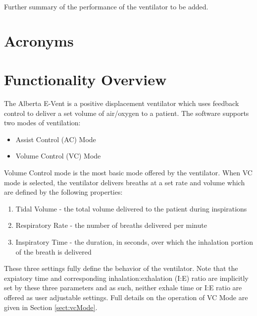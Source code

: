 \documentclass[]{article}
\begin{document}
Further summary of the performance of the ventilator to be added.

\clearpage

\section{Acronyms}

\begin{acronym}
	
	
	
	
	
	
	
	
\end{acronym}


\clearpage

\section{Functionality Overview}

The Alberta E-Vent is a positive displacement ventilator which uses feedback control to deliver a set volume of air/oxygen to a patient.  The software supports two modes of ventilation:
\begin{itemize}
	\item Assist Control (AC) Mode
	\item Volume Control (VC) Mode
\end{itemize}
Volume Control mode is the most basic mode offered by the ventilator.  When VC mode is selected, the ventilator delivers breaths at a set rate and volume which are defined by the following properties:
\begin{enumerate}
	\item Tidal Volume - the total volume delivered to the patient during inspirations
	\item Respiratory Rate - the number of breaths delivered per minute
	\item Inspiratory Time - the duration, in seconds, over which the inhalation portion of the breath is delivered
\end{enumerate}
These three settings fully define the behavior of the ventilator. Note that the expiatory time and corresponding inhalation:exhalation (I:E) ratio are implicitly set by these three parameters and as such, neither exhale time or I:E ratio are offered as user adjustable settings.  Full details on the operation of VC Mode are given in Section \ref{sect:vcMode}.
\end{document}
